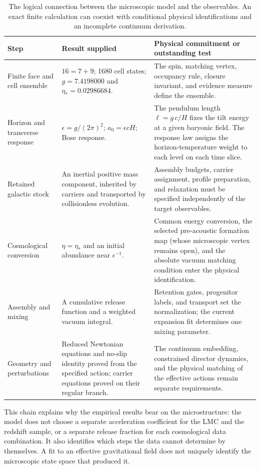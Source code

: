 \begin{table}[htbp]
\small
\begin{tabularx}{\textwidth}{P{.24\textwidth}YY}
\toprule
Step & Result supplied & Physical commitment or outstanding test \\
\midrule
Finite face and cell ensemble
& $16=7+9$; 1680 cell states; $g=7.4198000$ and $\eta_*=0.02986684$.
& The spin, matching vertex, occupancy rule, closure invariant, and
evidence measure define the ensemble. \\
Horizon and transverse response
& $\epsilon=g/(2\pi)^2$; $a_0=\epsilon cH$; Bose response.
& The pendulum length $\ell=g\,c/H$ fixes the tilt energy at a given baryonic field. The response law assigns the horizon-temperature weight to each level on each time slice. \\
Retained galactic stock
& An inertial positive mass component, inherited by carriers and
transported by collisionless evolution.
& Assembly budgets, carrier assignment, profile preparation, and
relaxation must be specified independently of the target observables. \\
Cosmological conversion
& $\eta=\eta_*$ and an initial abundance near $\epsilon^{-1}$.
& Common energy conversion, the selected pre-acoustic formation map
(whose microscopic vertex remains open), and the absolute vacuum
matching condition enter the physical identification. \\
Assembly and mixing
& A cumulative release function and a weighted vacuum integral.
& Retention gates, progenitor labels, and transport set the normalization;
the current expansion fit determines one mixing parameter. \\
Geometry and perturbations
& Reduced Newtonian equations and no-slip identity proved from the
specified action; carrier equations proved on their regular branch.
& The continuum embedding, constrained director dynamics, and the
physical matching of the effective actions remain separate requirements. \\
\bottomrule
\end{tabularx}
\caption{The logical connection between the microscopic model and the
observables. An exact finite calculation can coexist with conditional
physical identifications and an incomplete continuum derivation.}
\end{table}

This chain explains why the empirical results bear on the microstructure:
the model does not choose a separate acceleration coefficient for the LMC
and the redshift sample, or a separate release fraction for each
cosmological data combination. It also identifies which steps the data
cannot determine by themselves. A fit to an effective gravitational field
does not uniquely identify the microscopic state space that produced it.


